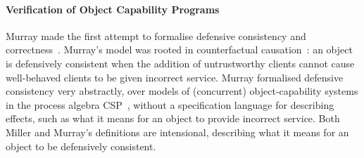 


\paragraph{Verification of Object Capability Programs}
Murray made the first attempt to formalise defensive consistency and
correctness~\cite{Murray10dphil}.  Murray's model was rooted in
counterfactual causation~\cite{Lewis_73}: an object is defensively
consistent when the addition of untrustworthy clients cannot cause
well-behaved clients to be given incorrect service.  Murray formalised
defensive consistency very abstractly, over models of (concurrent)
object-capability systems in the process algebra CSP~\cite{Hoare:CSP},
without a specification language for describing effects, such as what
it means for an object to provide incorrect service.  Both Miller and
Murray's definitions are intensional, describing what it means for an
object to be defensively consistent.


